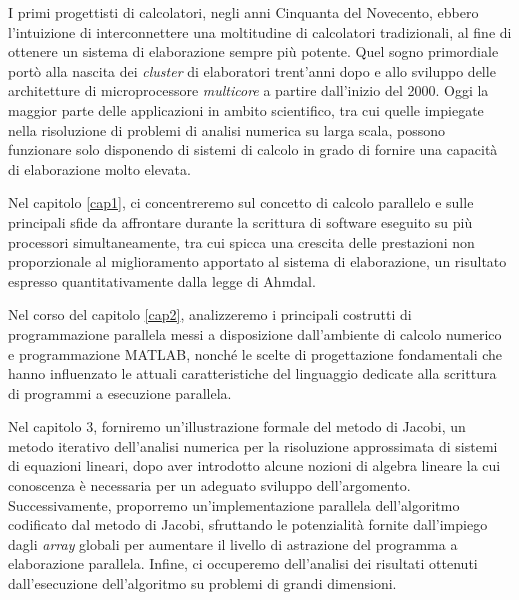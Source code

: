 I primi progettisti di calcolatori, negli anni Cinquanta del Novecento, ebbero l'intuizione di interconnettere
una moltitudine di calcolatori tradizionali, al fine di ottenere un sistema di elaborazione sempre più potente.\newline
Quel sogno primordiale port\`o alla nascita dei \textit{cluster} di elaboratori trent'anni dopo e allo sviluppo delle architetture di microprocessore
\textit{multicore} a partire dall'inizio del 2000.\newline
Oggi la maggior parte delle applicazioni in ambito scientifico, tra cui quelle impiegate nella risoluzione di problemi di analisi numerica
su larga scala, possono funzionare solo disponendo di sistemi di calcolo in grado di fornire una capacit\`a di elaborazione molto elevata.

Nel capitolo \ref{cap1}, ci concentreremo sul concetto di calcolo parallelo e sulle principali sfide da affrontare
durante la scrittura di software eseguito su pi\`u processori simultaneamente, tra cui spicca una crescita delle prestazioni non proporzionale
al miglioramento apportato al sistema di elaborazione, un risultato espresso quantitativamente dalla legge di Ahmdal.

Nel corso del capitolo \ref{cap2}, analizzeremo i principali costrutti di programmazione parallela messi a disposizione dall’ambiente di calcolo numerico
e programmazione MATLAB\textsuperscript{\textregistered}, nonch\'e le scelte di progettazione fondamentali che hanno influenzato
le attuali caratteristiche del linguaggio dedicate alla scrittura di programmi a esecuzione parallela.

Nel capitolo 3, forniremo un'illustrazione formale del metodo di Jacobi, un metodo iterativo dell’analisi numerica per la risoluzione
approssimata di sistemi di equazioni lineari, dopo aver introdotto alcune nozioni di algebra lineare la cui conoscenza \`e necessaria per un adeguato
sviluppo dell'argomento.\newline
Successivamente, proporremo un’implementazione parallela dell'algoritmo codificato dal metodo di Jacobi, sfruttando le potenzialità fornite
dall'impiego dagli \textit{array} globali per aumentare il livello di astrazione del programma a elaborazione parallela.\newline
Infine, ci occuperemo dell’analisi dei risultati ottenuti dall’esecuzione dell’algoritmo su problemi di grandi dimensioni.
